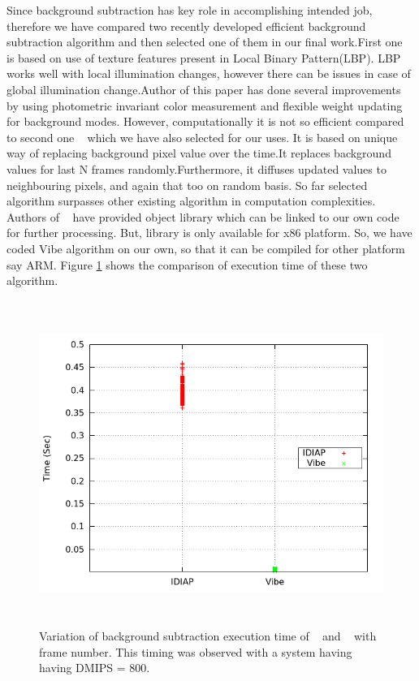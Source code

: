 Since background subtraction has key role in accomplishing intended job,
therefore we have compared two recently developed efficient background
subtraction algorithm and then selected one of them in our final
work.First one ~\cite{11} is based on use of texture features present in
Local Binary Pattern(LBP). LBP works well with local illumination
changes, however there can be issues in case of global illumination
change.Author of this paper has done several improvements by using
photometric invariant color measurement and flexible weight updating for
background modes. However, computationally it is not so efficient
compared to second one ~\cite{9} which we have also selected for our
uses.  It is based on unique way of replacing background pixel value
over the time.It replaces background values for last N frames
randomly.Furthermore, it diffuses updated values to neighbouring pixels,
and again that too on random basis. So far selected algorithm surpasses
other existing algorithm in computation complexities. Authors of
~\cite{9} have provided object library which can be linked to our own
code for further processing. But, library is only available for x86
platform. So, we have coded Vibe algorithm on our own, so that it can be
compiled for other platform say ARM. Figure \ref{bg_compare} shows the
comparison of execution time of these two algorithm.

\begin{figure}[!b]
\centering
\includegraphics[height=300pt]{Figures/bg_compare}
\caption{Variation of background subtraction execution time of ~\cite{11}
and ~\cite{9} with frame number. This timing was observed with a system
having having DMIPS = 800.}
\label{bg_compare}
\end{figure}

